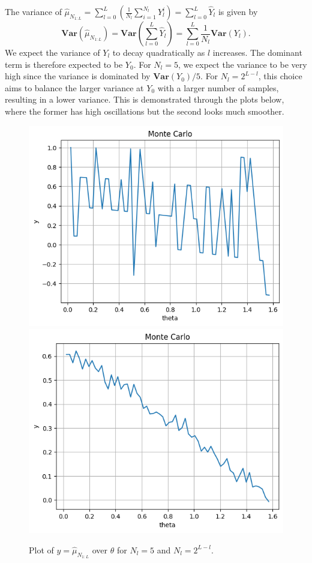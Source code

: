 \documentclass{article}
\begin{document}
The variance of \(\hat{\mu}_{N_{1:L}} = \sum_{l=0}^L \left(\frac{1}{N_l} \sum_{i=1}^{N_l} Y_l^i\right) = \sum_{l=0}^L \hat Y_l\) is given by
\[ \mathbf{Var}(\hat{\mu}_{N_{1:L}}) = \mathbf{Var}\left(\sum_{l=0}^L \hat Y_l \right) = \sum_{l=0}^L \frac{1}{N_l}\mathbf{Var}(Y_l). \]
We expect the variance of \(Y_l\) to decay quadratically as \(l\) increases. The dominant term is therefore expected to be \(Y_0\). For \(N_l = 5\), we expect the variance to be very high since the variance is dominated by \(\mathbf{Var}(Y_0)/5\). For \(N_l = 2^{L-l}\), this choice aims to balance the larger variance at \(Y_0\) with a larger number of samples, resulting in a lower variance. This is demonstrated through the plots below, where the former has high oscillations but the second looks much smoother.

\begin{figure}
    \centering
    \includegraphics[width=0.45\linewidth]{images/N1var.png}
    \includegraphics[width=0.45\linewidth]{images/N2var.png}
    \caption{Plot of \(y = \hat\mu_{N_{1:L}}\) over \(\theta\) for \(N_l = 5\) and \(N_l = 2^{L-l}.\)}
\end{figure}
\end{document}
